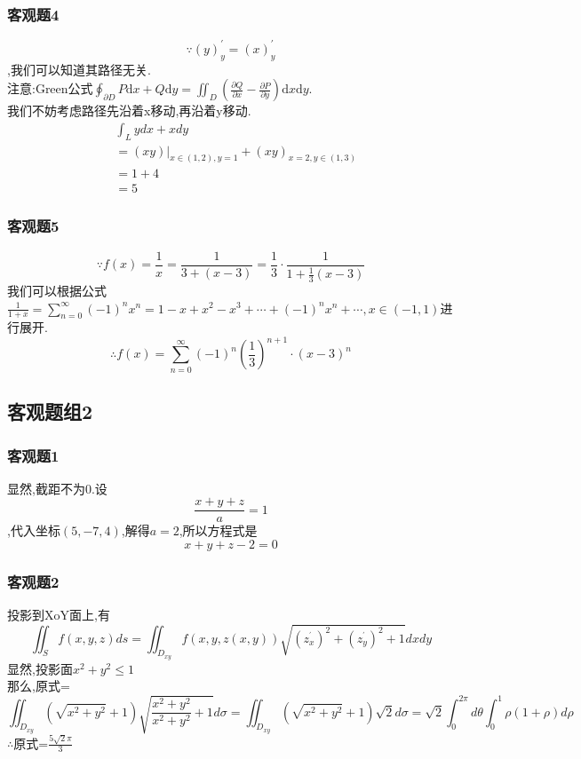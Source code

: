 \documentclass[a4paper,12pt]{ctexrep}
\begin{document}
\subsubsection{客观题4}
$$\because(y)^{\prime}_y=(x)^{\prime}_y$$,我们可以知道其路径无关. \\
注意:Green公式$\oint_{\partial D}P\mathrm{d}x+Q\mathrm{d}y=\iint_{D}\left(\frac{\partial Q}{\partial x}-\frac{\partial P}{\partial y}\right)\mathrm{d}x\mathrm{d}y$. \\
我们不妨考虑路径先沿着x移动,再沿着y移动.
\begin{equation*}
\begin{aligned}&\int_{L}ydx+xdy\\&
	=(xy)|_{x\in(1,2),y=1}+(xy)_{x=2,y\in(1,3)}\\&
	=1+4\\&
	=5\end{aligned}
\end{equation*}

\subsubsection{客观题5}
$$ \because f(x)=\frac{1}{x}=\frac{1}{3+(x-3)}=\frac{1}{3}\cdot\frac{1}{1+\frac{1}{3}(x-3)} $$
我们可以根据公式$\frac{1}{1+x}=\sum_{n=0}^\infty(-1)^nx^n=1-x+x^2-x^3+\cdots+(-1)^nx^n+\cdots,x\in(-1,1)$进行展开. 
$$ \therefore f(x) = \sum_{n=0}^\infty
(-1)^{n} (\frac{1}{3})^{n+1} \cdot (x-3)^{n} $$ 

\newpage

\subsection{客观题组2}
\subsubsection{客观题1}
显然,截距不为0.设
$$ \frac{x + y + z}{a} = 1 $$,代入坐标$(5,-7,4)$,解得$a=2$,所以方程式是$$x+y+z-2=0$$

\subsubsection{客观题2}
投影到XoY面上,有
$$\iint_Sf(x,y,z)ds=\iint_{D_{xy}}f(x,y,z(x,y))\sqrt{(z_x^{^{\prime}})^2+(z_y^{^{\prime}})^2+1}dxdy$$
显然,投影面$x^{2} + y^{2} \leq  1$ \\
那么,原式=$$\iint_{D_{xy}}(\sqrt{x^{2}+y^{2}}+1)\sqrt{\frac{x^{2}+y^{2}}{x^{2}+y^{2}}+1}d\sigma = \iint_{D_{xy}}(\sqrt{x^{2}+y^{2}}+1)\sqrt{2}d\sigma
=\sqrt{2}\int_{0}^{2\pi}d\theta\int_{0}^{1}\rho(1+\rho)d\rho$$
$\therefore $原式=$\frac{5 \sqrt{2} \pi}{3}$
\end{document}

